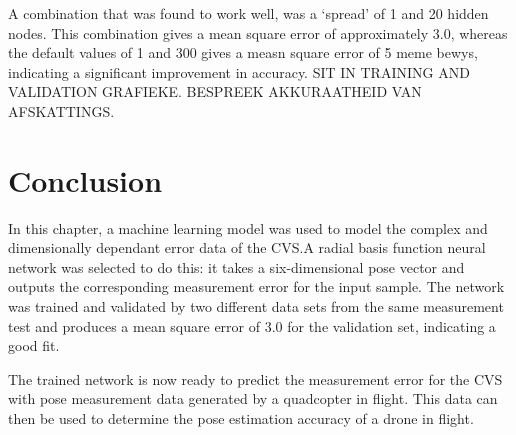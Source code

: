 A combination that was found to work well, was a `spread' of 1 and 20 hidden nodes. This combination gives a mean square error of approximately 3.0, whereas the default values of 1 and 300 gives a measn square error of 5 meme bewys, indicating a significant improvement in accuracy. SIT IN TRAINING AND VALIDATION GRAFIEKE. BESPREEK AKKURAATHEID VAN AFSKATTINGS.  

\section{Conclusion}

In this chapter, a machine learning model was used to model the complex and dimensionally dependant error data of the CVS.\@ A radial basis function neural network was selected to do this: it takes a six-dimensional pose vector and outputs the corresponding measurement error for the input sample. The network was trained and validated by two different data sets from the same measurement test and produces a mean square error of 3.0 for the validation set, indicating a good fit. 

The trained network is now ready to predict the measurement error for the CVS with pose measurement data generated by a quadcopter in flight. This data can then be used to determine the pose estimation accuracy of a drone in flight. 

